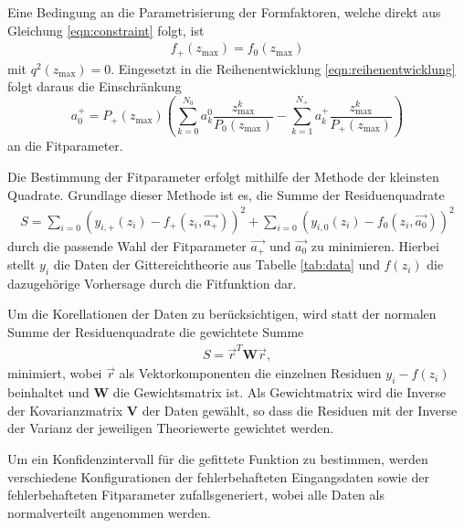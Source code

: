 Eine Bedingung an die Parametrisierung der Formfaktoren, welche direkt aus Gleichung \eqref{eqn:constraint} folgt, ist
\begin{align*}
  f_+(z_\text{max}) = f_0(z_\text{max})
\end{align*}
mit $q^2(z_\text{max}) = 0$.
Eingesetzt in die Reihenentwicklung \eqref{eqn:reihenentwicklung} folgt daraus die Einschränkung
\begin{equation}
  \label{eqn:einschr}
  a_0^+ = P_+(z_\text{max}) \left( \sum_{k=0}^{N_0} a_k^0 \frac{z_{\text{max}}^k}{P_0(z_\text{max})} - \sum_{k=1}^{N_+} a_k^+ \frac{z_{\text{max}}^k}{P_+(z_\text{max})} \right)
\end{equation}
an die Fitparameter.%

Die Bestimmung der Fitparameter erfolgt mithilfe der Methode der kleinsten Quadrate.
Grundlage dieser Methode ist es, die Summe der Residuenquadrate
\begin{align*}
  S = \sum_{i=0}^{} \left( y_{i,+}(z_i) - f_{+}(z_i, \vec{a_+}) \right)^2 + \sum_{i=0}^{} \left( y_{i,0}(z_i) - f_{0}(z_i, \vec{a_0}) \right)^2
\end{align*}
durch die passende Wahl der Fitparameter $\vec{a_+}$ und $\vec{a_0}$ zu minimieren.
Hierbei stellt $y_i$ die Daten der Gittereichtheorie aus Tabelle \ref{tab:data} und $f(z_i)$ die dazugehörige Vorhersage durch die Fitfunktion dar.

Um die Korellationen der Daten zu berücksichtigen, wird statt der normalen Summe der Residuenquadrate die gewichtete Summe
\begin{align*}
  S = \vec{r}^T \symbf{W} \vec{r},
\end{align*}
minimiert, wobei $\vec{r}$ als Vektorkomponenten die einzelnen Residuen $y_i - f(z_i)$ beinhaltet und $\symbf{W}$ die Gewichtsmatrix ist.
Als Gewichtmatrix wird die Inverse der Kovarianzmatrix $\symbf{V}$ der Daten gewählt, so dass die Residuen mit der Inverse der Varianz der jeweiligen Theoriewerte gewichtet werden. 

Um ein Konfidenzintervall für die gefittete Funktion zu bestimmen, werden $$ verschiedene Konfigurationen der fehlerbehafteten Eingangsdaten sowie der fehlerbehafteten Fitparameter zufallsgeneriert, wobei alle Daten als normalverteilt angenommen werden. 

